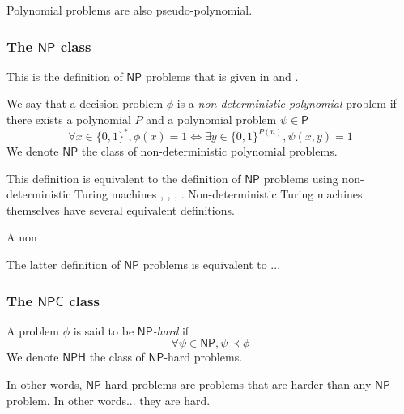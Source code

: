 \begin{proposition}
    Polynomial problems are also pseudo-polynomial.
\end{proposition}

\subsubsection{The $ \mathsf{NP} $ class}

This is the definition of $ \mathsf{NP} $ problems that is given in \cite{gowers2023} and \cite{gowers2024}.

\begin{definition}
    We say that a decision problem $ \phi $ is a \textit{non-deterministic polynomial} problem if there exists a polynomial $ P $ and a polynomial problem $ \psi \in \mathsf P $
    \[
        \forall x \in \{ 0,1 \}^*, \phi(x) = 1 \iff \exists y \in \{ 0,1 \}^{P(n)}, \psi(x,y) = 1
    \]
    We denote $ \mathsf{NP} $ the class of non-deterministic polynomial problems.
\end{definition}

This definition is equivalent to the definition of $ \mathsf{NP} $ problems using non-deterministic Turing machines \cite{hudry2024}, \cite{charonhudry2019}, \cite{gowers2023}, \cite{gowers2024}. Non-deterministic Turing machines themselves have several equivalent definitions.

\begin{definition}
    A non
\end{definition}

\begin{proposition}
    The latter definition of $ \mathsf{NP} $ problems is equivalent to ...
\end{proposition}
\subsubsection{The $ \mathsf{NPC} $ class}

\begin{definition}
    A problem $ \phi $ is said to be \textit{$ \mathsf{NP} $-hard} if
    \[
        \forall \psi \in \mathsf{NP}, \psi \prec \phi
    \]
    We denote $ \mathsf{NPH} $ the class of $ \mathsf{NP} $-hard problems.
\end{definition}

In other words, $ \mathsf{NP} $-hard problems are problems that are harder than any $ \mathsf{NP} $ problem. In other words... they are hard.

